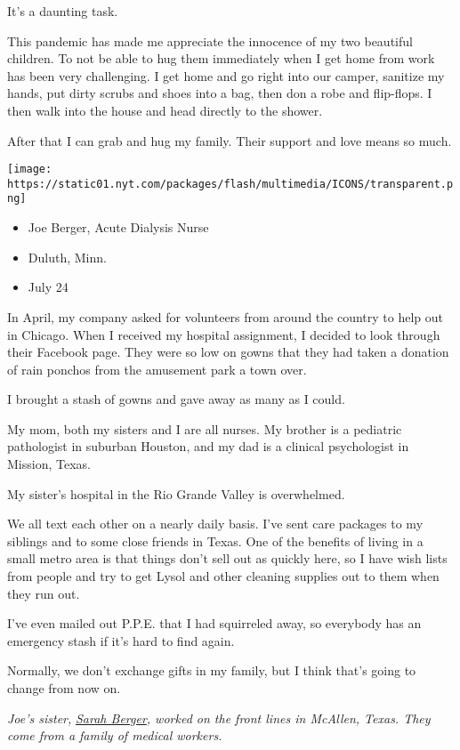 It's a daunting task.

This pandemic has made me appreciate the innocence of my two beautiful
children. To not be able to hug them immediately when I get home from
work has been very challenging. I get home and go right into our camper,
sanitize my hands, put dirty scrubs and shoes into a bag, then don a
robe and flip-flops. I then walk into the house and head directly to the
shower.

After that I can grab and hug my family. Their support and love means so
much.

\texttt{[image: https://static01.nyt.com/packages/flash/multimedia/ICONS/transparent.png]}

\begin{itemize}
\tightlist
\item
  Joe Berger, Acute Dialysis Nurse
\item
  Duluth, Minn.
\item
  July 24
\end{itemize}

In April, my company asked for volunteers from around the country to
help out in Chicago. When I received my hospital assignment, I decided
to look through their Facebook page. They were so low on gowns that they
had taken a donation of rain ponchos from the amusement park a town
over.

I brought a stash of gowns and gave away as many as I could.

My mom, both my sisters and I are all nurses. My brother is a pediatric
pathologist in suburban Houston, and my dad is a clinical psychologist
in Mission, Texas.

My sister's hospital in the Rio Grande Valley is overwhelmed.

We all text each other on a nearly daily basis. I've sent care packages
to my siblings and to some close friends in Texas. One of the benefits
of living in a small metro area is that things don't sell out as quickly
here, so I have wish lists from people and try to get Lysol and other
cleaning supplies out to them when they run out.

I've even mailed out P.P.E. that I had squirreled away, so everybody has
an emergency stash if it's hard to find again.

Normally, we don't exchange gifts in my family, but I think that's going
to change from now on.

\emph{Joe's sister,}
\emph{\href{https://www.nytimes.com/interactive/2020/world/coronavirus-health-care-workers.html\#item-sarah-berger}{Sarah
Berger}, worked on the front lines in McAllen, Texas. They come from a
family of medical workers.}

